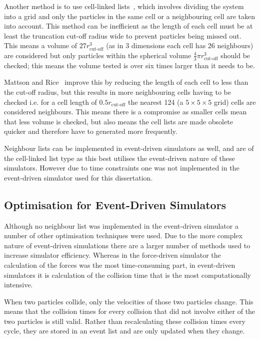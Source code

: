 \documentclass[12pt]{UoAthesis} \usepackage{booktabs}
\begin{document}
Another method is to use cell-linked lists~\cite{Poschel2005}, which
involves dividing the system into a grid and only the particles in the
same cell or a neighbouring cell are taken into account.  This method
can be inefficient as the length of each cell must be at least
the truncation cut-off radius wide to prevent particles being missed
out.  This means a volume of $27r_{\text{cut-off}}^3$ (as in 3
dimensions each cell has 26 neighbours) are considered but only
particles within the spherical volume $\frac{4}{3}\pi
r_{\text{cut-off}}^3$ should be checked; this means the volume tested
is over six times larger than it needs to be.

Mattson and Rice~\cite{Mattson1999} improve this by reducing the
length of each cell to less than the cut-off radius, but this results
in more neighbouring cells having to be checked i.e. for a cell length
of $0.5r_{\text{cut-off}}$ the nearest 124 (a $5\times 5\times 5$
grid) cells are considered neighbours. This means there is a
compromise as smaller cells mean that less volume is checked, but also
means the cell lists are made obsolete quicker and therefore have to
generated more frequently.

Neighbour lists can be implemented in event-driven simulators as well,
and are of the cell-linked list type as this best utilises the
event-driven nature of these simulators.  However due to time
constraints one was not implemented in the event-driven simulator used
for this dissertation.

\subsection{Optimisation for Event-Driven Simulators}
Although no neighbour list was implemented in the event-driven simulator
a number of other optimisation techniques were used.  Due to the more
complex nature of event-driven simulations there are a larger number
of methods used to increase simulator efficiency.  Whereas in the
force-driven simulator the calculation of the forces was the most
time-consuming part, in event-driven simulators it is calculation of
the collision time that is the most computationally intensive.

When two particles collide, only the velocities of those two particles
change.  This means that the collision times for every collision that
did not involve either of the two particles is still valid.  Rather
than recalculating these collision times every cycle, they are stored
in an event list and are only updated when they change.  
\end{document}
